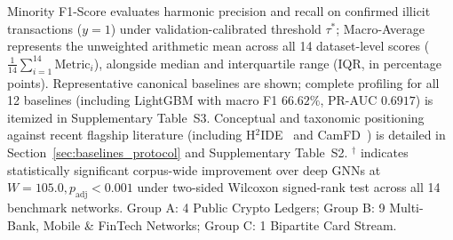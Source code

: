 \begin{table}[t]
{}
\vspace{0.5mm}
\scriptsize{Minority F1-Score evaluates harmonic precision and recall on confirmed illicit transactions ($y=1$) under validation-calibrated threshold $\tau^*$; Macro-Average represents the unweighted arithmetic mean across all 14 dataset-level scores ($\frac{1}{14}\sum_{i=1}^{14} \text{Metric}_i$), alongside median and interquartile range (IQR, in percentage points). Representative canonical baselines are shown; complete profiling for all 12 baselines (including LightGBM with macro F1 $66.62\%$, PR-AUC $0.6917$) is itemized in Supplementary Table~S3. Conceptual and taxonomic positioning against recent flagship literature (including H$^2$IDE~\cite{fu2025nowhere} and CamFD~\cite{ou2025camfd}) is detailed in Section~\ref{sec:baselines_protocol} and Supplementary Table~S2. $^\dagger$ indicates statistically significant corpus-wide improvement over deep GNNs at $W=105.0, p_{\text{adj}} < 0.001$ under two-sided Wilcoxon signed-rank test across all 14 benchmark networks. Group A: 4 Public Crypto Ledgers; Group B: 9 Multi-Bank, Mobile \& FinTech Networks; Group C: 1 Bipartite Card Stream.}
\end{table}
